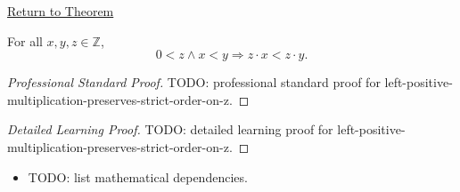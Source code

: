 \newpage
{}
\label{prf:left-positive-multiplication-preserves-strict-order-on-z}

\begin{remark*}[Return]
\hyperref[thm:left-positive-multiplication-preserves-strict-order-on-z]{Return to Theorem}
\end{remark*}

\begin{theorem*}
For all $x,y,z\in\mathbb{Z}$,
\[
0<z\land x<y \Longrightarrow z\cdot x<z\cdot y.
\]
\end{theorem*}

\begin{proof}[Professional Standard Proof]
\LRAProofBodyStart
TODO: professional standard proof for left-positive-multiplication-preserves-strict-order-on-z.
\end{proof}

\begin{proof}[Detailed Learning Proof]
\LRAProofBodyStart
TODO: detailed learning proof for left-positive-multiplication-preserves-strict-order-on-z.
\end{proof}

\begin{remark*}
\end{remark*}

\begin{dependencies}
\begin{itemize}
  \item TODO: list mathematical dependencies.
\end{itemize}
\end{dependencies}

\clearpage
